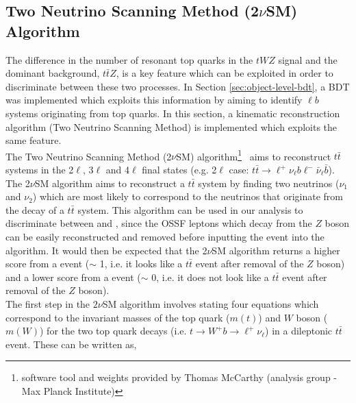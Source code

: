 \subsection{Two Neutrino Scanning Method (2$\nu$SM) Algorithm}
\label{sec:2vsm}
The difference in the number of resonant top quarks in the $tWZ$ signal and the dominant background, $t\bar{t}Z$, is a key feature which can be exploited in order to discriminate between these two processes. In Section \ref{sec:object-level-bdt}, a BDT was implemented which exploits this information by aiming to identify $\ell b$ systems originating from top quarks. In this section, a kinematic reconstruction algorithm (Two Neutrino Scanning Method) is implemented which exploits the same feature.\\

The Two Neutrino Scanning Method (2$\nu$SM) algorithm\footnote{software tool and weights provided by Thomas McCarthy (\ttZ analysis group - Max Planck Institute)}~\cite{2vSM-ref1,2vSM-ref2} aims to reconstruct $t\bar{t}$ systems in the 2$\ell$, 3$\ell$ and 4$\ell$ final states (e.g. 2$\ell$ case: $t\bar{t}\rightarrow \ell^{+}\nu_{\ell}b\ell^{-}\bar{\nu}_{\ell}\bar{b}$). The 2$\nu$SM algorithm aims to reconstruct a $t\bar{t}$ system by finding two neutrinos ($\nu_{1}$ and $\nu_{2}$) which are most likely to correspond to the neutrinos that originate from the decay of a $t\bar{t}$ system. This algorithm can be used in our analysis to discriminate between \tWZ and \ttZ, since the OSSF leptons which decay from the $Z$ boson can be easily reconstructed and removed before inputting the event into the algorithm. It would then be expected that the 2$\nu$SM algorithm returns a higher score from a \ttZ event ($\sim$ 1, i.e. it looks like a $t\bar{t}$ event after removal of the $Z$ boson) and a lower score from a \tWZ event ($\sim$ 0, i.e. it does not look like a $t\bar{t}$ event after removal of the $Z$ boson).\\

The first step in the $2\nu$SM algorithm involves stating four equations which correspond to the invariant masses of the top quark ($m(t)$) and $W$ boson ($m(W)$) for the two top quark decays (i.e. $t\rightarrow W^{+}b \rightarrow \ell^{+} \nu_{\ell}$) in a dileptonic $t\bar{t}$ event. These can be written as,


